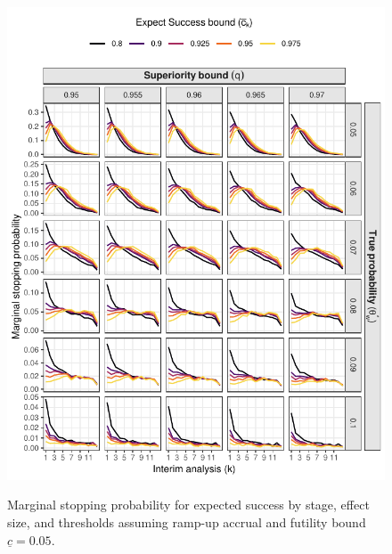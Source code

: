 \documentclass{article}
\begin{document}
\begin{figure}[!ht]
	\caption{Marginal stopping probability for expected success by stage, effect size, and thresholds assuming ramp-up accrual and futility bound $\underline{c}=0.05$.}
	\includegraphics{stop_expect_success_5.pdf}
	\label{fig:stop_expect_success_rampup}
\end{figure}
\end{document}
